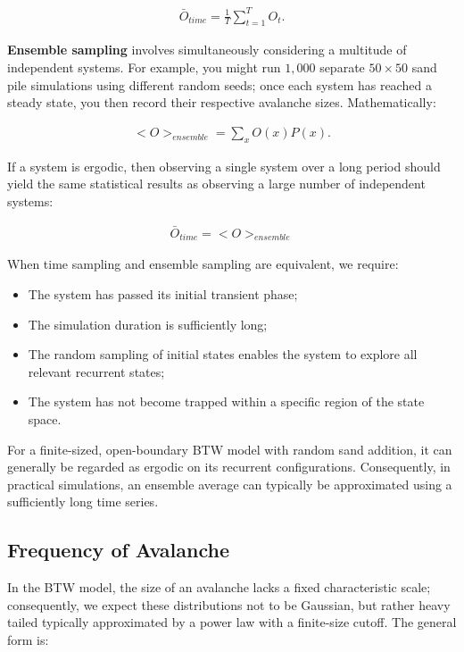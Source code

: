 \documentclass{article}
\begin{document}
\begin{align}
    \bar{O}_{time} = \frac{1}{T} \sum^T_{t=1} O_t.
\end{align}

\textbf{Ensemble sampling} involves simultaneously considering a multitude of independent systems. For example, you might run $1,000$ separate $50 \times 50$ sand pile simulations using different random seeds; once each system has reached a steady state, you then record their respective avalanche sizes. Mathematically:

\begin{align}
    <O>_{ensemble} = \sum_x O(x) P(x).
\end{align}

If a system is ergodic, then observing a single system over a long period should yield the same statistical results as observing a large number of independent systems:

\begin{align}
    \bar{O}_{time} = <O>_{ensemble}
\end{align}

When time sampling and ensemble sampling are equivalent, we require:
\begin{itemize}
    \item The system has passed its initial transient phase;
    \item The simulation duration is sufficiently long;
    \item The random sampling of initial states enables the system to explore all relevant recurrent states;
    \item The system has not become trapped within a specific region of the state space.
\end{itemize}
For a finite-sized, open-boundary BTW model with random sand addition, it can generally be regarded as ergodic on its recurrent configurations. Consequently, in practical simulations, an ensemble average can typically be approximated using a sufficiently long time series.

\clearpage

\subsection{Frequency of Avalanche}
In the BTW model, the size of an avalanche lacks a fixed characteristic scale; consequently, we expect these distributions not to be Gaussian, but rather heavy tailed typically approximated by a power law with a finite-size cutoff. The general form is:
\end{document}
